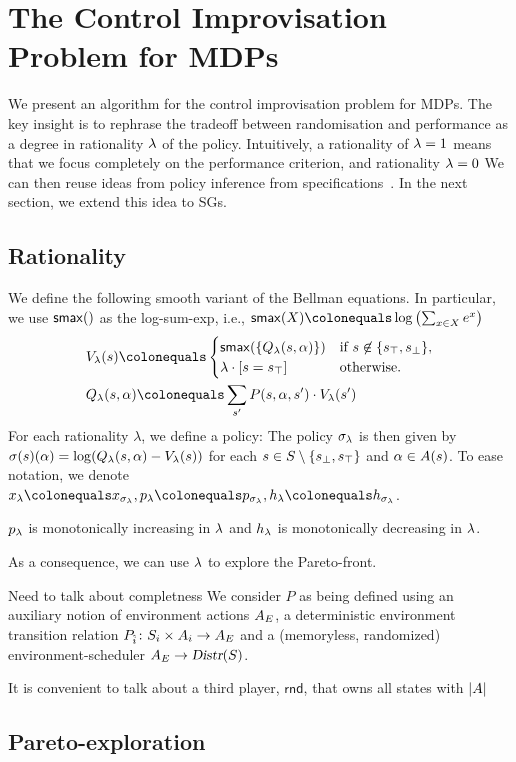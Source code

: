
\section{The Control Improvisation Problem for MDPs}
\label{sec:mdps}


We present an algorithm for the control improvisation problem for MDPs. The key insight is to rephrase the tradeoff between randomisation and performance as a degree in rationality $\lambda$ of the policy. Intuitively, a rationality of $\lambda = 1$ means that we focus completely on the performance criterion, and rationality $\lambda = 0$ We can then reuse ideas from policy inference from specifications~\cite{DBLP:conf/cav/Vazquez-Chanlatte20}.
In the next section, we extend this idea to SGs. 

\subsection{Rationality}

We define the following smooth variant of the Bellman equations. In particular, we use $\mathsf{smax}()$ as the log-sum-exp, i.e., $\smoothmax{X}  \colonequals \log \left( \sum_{x\in X} e^x \right)$
\begin{align}
	& V_\rat(s) \colonequals  \begin{cases} \smoothmax{\{  Q_\rat(s,\act) \}} & \text{if }s \not\in \{ \target, \sink \}, \\ \lambda  \cdot \indicator{s = \target} & \text{otherwise.}  \end{cases}\\ 
	& Q_\rat(s, \act) \colonequals \sum_{s'} P(s,\act,s') \cdot V_\rat(s')
\end{align}
For each rationality $\lambda$, we define a policy:
The policy $\sigma_\lambda$ is then given by $\sigma(s)(\alpha) = \log( Q_\lambda(s,\alpha) - V_\lambda(s))$ for each $s \in S \setminus \{ s_{\bot}, s_{\top} \}$ and $\alpha \in A(s)$.
To ease notation, we denote $x_\rat \colonequals x_{\sched_\rat}, \scp_\rat \colonequals \scp_{\sched_\rat}, \rndp_\rat \colonequals \rndp_{\sched_\rat}$.

\begin{proposition}
$p_\lambda$ is monotonically increasing in $\lambda$ and $h_\lambda$ is monotonically decreasing in $\lambda$.	
\end{proposition}
As a consequence, we can use $\lambda$ to explore the Pareto-front. 


{\color{red}Need to talk about completness}
\color{black!50}
We consider $P$ as being defined using an auxiliary notion of environment actions $A_E$, a deterministic environment transition relation $P_{\hat{i}}\colon S_i \times A_i \rightarrow A_E$ and a (memoryless, randomized) environment-scheduler $A_E \rightarrow \textsl{Distr}(S)$.



It is convenient to talk about a third player, $\mathsf{rnd}$, that owns all states with $|A|$



\color{black}

\subsection{Pareto-exploration}



